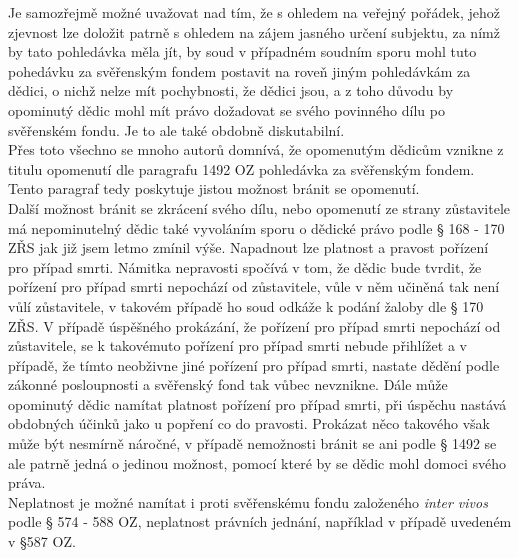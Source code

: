 \documentclass{article}
\begin{document}
  Je samozřejmě možné uvažovat nad tím, že s ohledem na veřejný pořádek, jehož zjevnost lze doložit patrně s ohledem na zájem jasného určení subjektu, za nímž by tato pohledávka měla jít, by soud v případném soudním sporu mohl tuto pohedávku za svěřenským fondem postavit na roveň jiným pohledávkám za dědici, o nichž nelze mít pochybnosti, že dědici jsou, a z toho důvodu by opominutý dědic mohl mít právo dožadovat se svého povinného dílu po svěřenském fondu. Je to ale také obdobně diskutabilní.\\
  
  Přes toto všechno se mnoho autorů domnívá, že opomenutým dědicům vznikne z titulu opomenutí dle paragrafu 1492 OZ pohledávka za svěřenským fondem. Tento paragraf tedy poskytuje jistou možnost bránit se opomenutí.\\
  
  Další možnost bránit se zkrácení svého dílu, nebo opomenutí ze strany zůstavitele má nepominutelný dědic také vyvoláním sporu o dědické právo podle § 168 - 170 ZŘS jak již jsem letmo zmínil výše. Napadnout lze platnost a pravost pořízení pro případ smrti. Námitka nepravosti spočívá v tom, že dědic bude tvrdit, že pořízení pro případ smrti nepochází od zůstavitele, vůle v něm učiněná tak není vůlí zůstavitele, v takovém případě ho soud odkáže k podání žaloby dle § 170 ZŘS. V případě úspěšného prokázání, že pořízení pro případ smrti nepochází od zůstavitele, se k takovémuto pořízení pro případ smrti nebude přihlížet a v případě, že tímto neobživne jiné pořízení pro případ smrti, nastate dědění podle zákonné posloupnosti a svěřenský fond tak vůbec nevznikne. Dále může opominutý dědic namítat platnost pořízení pro případ smrti, při úspěchu nastává obdobných účinků jako u popření co do pravosti. Prokázat něco takového však může být nesmírně náročné, v případě nemožnosti bránit se ani podle § 1492 se ale patrně jedná o jedinou možnost, pomocí které by se dědic mohl domoci svého práva.\\
  
  Neplatnost je možné namítat i proti svěřenskému fondu založeného \textit{inter vivos} podle § 574 - 588 OZ, neplatnost právních jednání, například v případě uvedeném v §587 OZ.\\
  
 
\end{document}
